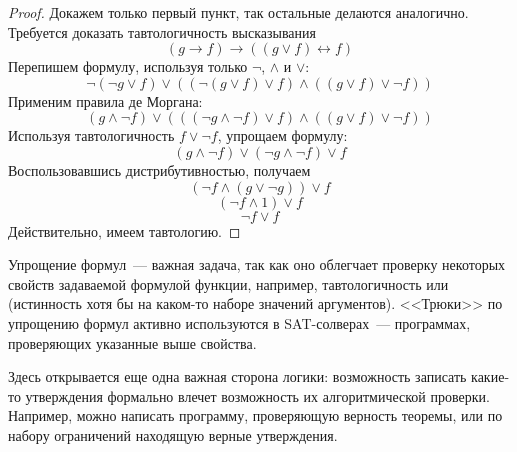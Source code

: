 \begin{proof}
    Докажем только первый пункт, так остальные делаются аналогично.
    Требуется доказать тавтологичность высказывания
    \[
        (g \rightarrow f) \rightarrow ((g \vee f) \leftrightarrow f)
    \]
    Перепишем формулу, используя только $ \neg $, $ \wedge $ и $ \vee $:
    \[
        \neg (\neg g \vee f) \vee ((\neg (g \vee f) \vee f) \wedge ((g \vee f) \vee \neg f))
    \]
    Применим правила де Моргана:
    \[
        (g \wedge \neg f) \vee (((\neg g \wedge \neg f) \vee f) \wedge ((g \vee f) \vee \neg f))
    \]
    Используя тавтологичность $ f \vee \neg f $, упрощаем формулу:
    \[
        (g \wedge \neg f) \vee (\neg g \wedge \neg f) \vee f
    \]
    Воспользовавшись дистрибутивностью, получаем
    \[
        (\neg f \wedge (g \vee \neg g)) \vee f
    \]
    \[
        (\neg f \wedge 1) \vee f
    \]
    \[
        \neg f \vee f
    \]
    Действительно, имеем тавтологию.
\end{proof}

Упрощение формул~--- важная задача, так как оно облегчает проверку некоторых свойств задаваемой формулой функции, например,
тавтологичность или  (истинность хотя бы на каком-то наборе значений аргументов).
<<Трюки>> по упрощению формул активно используются в SAT-солверах~--- программах, проверяющих указанные выше свойства.

Здесь открывается еще одна важная сторона логики: возможность записать какие-то утверждения формально влечет возможность их алгоритмической проверки.
Например, можно написать программу, проверяющую верность теоремы, или по набору ограничений находящую верные утверждения.

